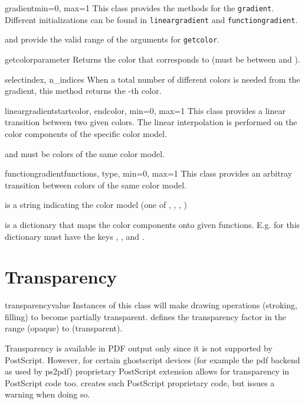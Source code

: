 \begin{classdesc}{gradient}{min=0, max=1}
  This class provides the methods for the \verb|gradient|. Different
  initializations can be found in \verb|lineargradient| and
  \verb|functiongradient|.

   and  provide the valid range of the arguments for
  \verb|getcolor|.

  \begin{funcdesc}{getcolor}{parameter}
    Returns the color that corresponds to  (must be between
     and ).
  \end{funcdesc}

  \begin{funcdesc}{select}{index, n\_indices}
    When a total number of  different colors is needed from the
    gradient, this method returns the -th color.
  \end{funcdesc}

\end{classdesc}


\begin{classdesc}{lineargradient}{startcolor, endcolor, min=0, max=1}
  This class provides a linear transition between two given colors. The linear
  interpolation is performed on the color components of the specific color
  model.

   and  must be colors of the same color model.
\end{classdesc}

\begin{classdesc}{functiongradient}{functions, type, min=0, max=1}
  This class provides an arbitray transition between colors of the same
  color model.

   is a string indicating the color model (one of ,
  , , )

   is a dictionary that maps the color components onto given
  functions. E.g. for  this dictionary must have the keys
  , , and .

\end{classdesc}

\section{Transparency}

\begin{classdesc}{transparency}{value}
  Instances of this class will make drawing operations (stroking,
  filling) to become partially transparent.  defines the
  transparency factor in the range  (opaque) to 
  (transparent).

  Transparency is available in PDF output only since it is not
  supported by PostScript. However, for certain ghostscript devices
  (for example the pdf backend as used by ps2pdf) proprietary
  PostScript extension allows for transparency in PostScript code too.
  \PyX{} creates such PostScript proprietary code, but issues a
  warning when doing so.
\end{classdesc}


